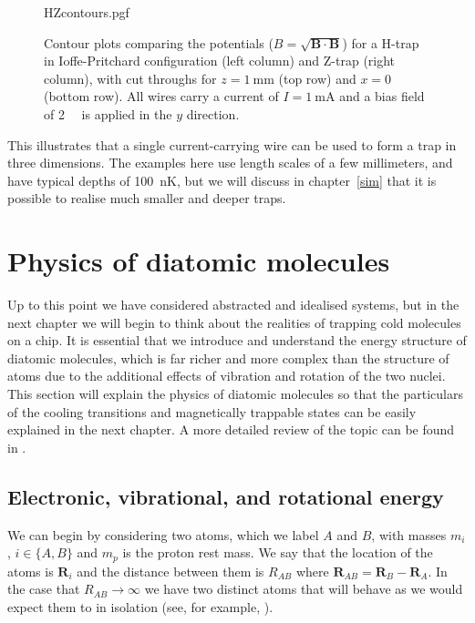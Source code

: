 \begin{figure}[htbp]
  \centering
  {HZcontours.pgf}
  \caption[Comparison of H- and Z-traps]{
    Contour plots comparing the potentials ($B =
    \sqrt{\mathbf{B}\cdot\mathbf{B}}$) for a H-trap in
    Ioffe-Pritchard configuration (left column) and Z-trap (right column), with
    cut throughs for $z=\SI{1}{\milli\meter}$ (top row) and $x=0$ (bottom row).
    All wires carry a current of $I=\SI{1}{\milli\ampere}$ and a bias field of
    \SI{2}{\milli\gauss} is applied in the $y$ direction.}
  \label{theory:fig:HZcontours}
\end{figure}

This illustrates that a single current-carrying wire can be used to form a trap
in three dimensions. The examples here use length scales of a few millimeters,
and have typical depths of \SI{100}{\nano\kelvin}, but we will discuss in
chapter~\ref{sim} that it is possible to realise much smaller and deeper traps.


\section{Physics of diatomic molecules}
\label{theory:molecules}

Up to this point we have considered abstracted and idealised systems, but in
the next chapter we will begin to think about the realities of trapping cold
molecules on a chip. It is essential that we introduce and understand the
energy structure of diatomic molecules, which is far richer and more complex
than the structure of atoms due to the additional effects of vibration and
rotation of the two nuclei. This section will explain the physics of diatomic
molecules so that the particulars of the cooling transitions and magnetically
trappable states can be easily explained in the next chapter. A more
detailed review of the topic can be found in .

\subsection{Electronic, vibrational, and rotational energy}

We can begin by considering two atoms, which we label $A$ and $B$,
with masses  $m_i$, $i\in\{A,B\}$ and $m_p$ is the proton rest mass. We say that the location of the
atoms is $\mathbf{R}_i$ and the distance between them is
$R_{AB}$ where $\mathbf{R}_{AB} = \mathbf{R}_B - \mathbf{R}_A$. In the case
that $R_{AB} \rightarrow \infty$ we have two distinct atoms that will behave 
as we would expect them to in isolation (see, for example,
).

